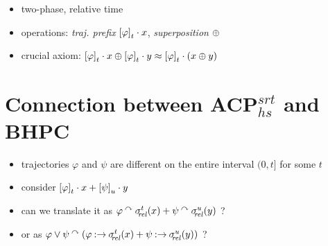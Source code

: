 \begin{slide}
\begin{itemize}
\begin{itemize}
  \item two-phase, relative time 
  \item operations: \emph{traj. prefix} $\left[ {\varphi} \right]_{t}\mathbin{\cdot} x$, \emph{superposition} $\oplus$
  \item crucial axiom: $\left[ {\varphi} \right]_{t}\mathbin{\cdot} x\oplus \left[ {\varphi} \right]_{t}\mathbin{\cdot} y\approx \left[ {\varphi} \right]_{t}\mathbin{\cdot} (x\oplus y)$
  \end{itemize}
\end{itemize}
\newslide\section*{Connection between ACP$^{srt}_{hs}$ and BHPC}
\begin{itemize}
\item trajectories $\varphi$ and $\psi$ are different on the entire interval $(0,t]$ for some $t$
\item consider $\left[ {\varphi} \right]_{t}\mathbin{\cdot} x+\left[ {\psi} \right]_{u}\mathbin{\cdot} y$
\item can we translate it as $\varphi\mathbin{\mathop{^\curvearrowright}}\mathop{\sigma_{\!\!\mathit{rel}}^{t}}(x)+\psi\mathbin{\mathop{^\curvearrowright}}\mathop{\sigma_{\!\!\mathit{rel}}^{u}}(y)$ ?
\pause
\item or as $\varphi\vee\psi\mathbin{\mathop{^\curvearrowright}}(\varphi\mathbin{\mathop{:\rightarrow}}\mathop{\sigma_{\!\!\mathit{rel}}^{t}}(x)+\psi\mathbin{\mathop{:\rightarrow}}\mathop{\sigma_{\!\!\mathit{rel}}^{u}}(y))$ ?
\end{itemize}


\end{slide}
